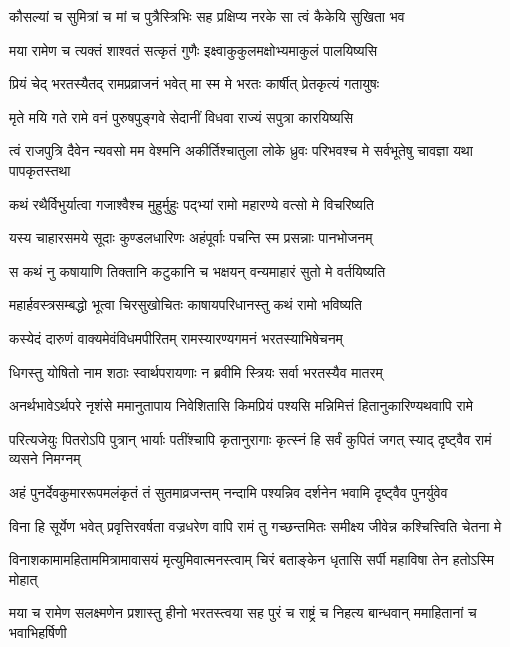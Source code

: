 \twolineshloka
{कौसल्यां च सुमित्रां च मां च पुत्रैस्त्रिभिः सह}
{प्रक्षिप्य नरके सा त्वं कैकेयि सुखिता भव} %

\twolineshloka
{मया रामेण च त्यक्तं शाश्वतं सत्कृतं गुणैः}
{इक्ष्वाकुकुलमक्षोभ्यमाकुलं पालयिष्यसि} %

\twolineshloka
{प्रियं चेद् भरतस्यैतद् रामप्रव्राजनं भवेत्}
{मा स्म मे भरतः कार्षीत् प्रेतकृत्यं गतायुषः} %

\twolineshloka
{मृते मयि गते रामे वनं पुरुषपुङ्गवे}
{सेदानीं विधवा राज्यं सपुत्रा कारयिष्यसि} %

\threelineshloka
{त्वं राजपुत्रि दैवेन न्यवसो मम वेश्मनि}
{अकीर्तिश्चातुला लोके ध्रुवः परिभवश्च मे}
{सर्वभूतेषु चावज्ञा यथा पापकृतस्तथा} %

\twolineshloka
{कथं रथैर्विभुर्यात्वा गजाश्वैश्च मुहुर्मुहुः}
{पद्भ्यां रामो महारण्ये वत्सो मे विचरिष्यति} %

\twolineshloka
{यस्य चाहारसमये सूदाः कुण्डलधारिणः}
{अहंपूर्वाः पचन्ति स्म प्रसन्नाः पानभोजनम्} %

\twolineshloka
{स कथं नु कषायाणि तिक्तानि कटुकानि च}
{भक्षयन् वन्यमाहारं सुतो मे वर्तयिष्यति} %

\twolineshloka
{महार्हवस्त्रसम्बद्धो भूत्वा चिरसुखोचितः}
{काषायपरिधानस्तु कथं रामो भविष्यति} %

\twolineshloka
{कस्येदं दारुणं वाक्यमेवंविधमपीरितम्}
{रामस्यारण्यगमनं भरतस्याभिषेचनम्} %

\twolineshloka
{धिगस्तु योषितो नाम शठाः स्वार्थपरायणाः}
{न ब्रवीमि स्त्रियः सर्वा भरतस्यैव मातरम्} %

\twolineshloka
{अनर्थभावेऽर्थपरे नृशंसे ममानुतापाय निवेशितासि}
{किमप्रियं पश्यसि मन्निमित्तं हितानुकारिण्यथवापि रामे} %

\twolineshloka
{परित्यजेयुः पितरोऽपि पुत्रान् भार्याः पतींश्चापि कृतानुरागाः}
{कृत्स्नं हि सर्वं कुपितं जगत् स्याद् दृष्ट्वैव रामं व्यसने निमग्नम्} %

\twolineshloka
{अहं पुनर्देवकुमाररूपमलंकृतं तं सुतमाव्रजन्तम्}
{नन्दामि पश्यन्निव दर्शनेन भवामि दृष्ट्वैव पुनर्युवेव} %

\twolineshloka
{विना हि सूर्येण भवेत् प्रवृत्तिरवर्षता वज्रधरेण वापि}
{रामं तु गच्छन्तमितः समीक्ष्य जीवेन्न कश्चित्त्विति चेतना मे} %

\twolineshloka
{विनाशकामामहिताममित्रामावासयं मृत्युमिवात्मनस्त्वाम्}
{चिरं बताङ्केन धृतासि सर्पी महाविषा तेन हतोऽस्मि मोहात्} %

\twolineshloka
{मया च रामेण सलक्ष्मणेन प्रशास्तु हीनो भरतस्त्वया सह}
{पुरं च राष्ट्रं च निहत्य बान्धवान् ममाहितानां च भवाभिहर्षिणी} %

